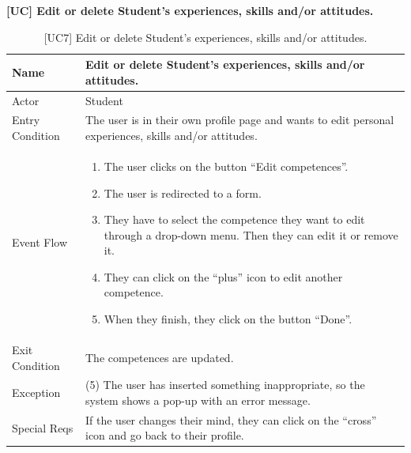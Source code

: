 \textbf{[UC\nextUseCases] Edit or delete Student’s experiences, skills and/or attitudes.}
\begin{table}[H] %
    \centering
    \begin{tabular}{|p{3cm}|p{10cm}|}
    \hline
    Name & Edit or delete Student’s experiences, skills and/or attitudes. \\ \hline
    Actor  & Student \\ \hline
    Entry Condition  & The user is in their own profile page and wants to edit personal experiences, skills and/or attitudes. \\ \hline
    Event Flow  & 
    \begin{enumerate}[noitemsep, topsep=0pt]
        \item The user clicks on the button “Edit competences”.
        \item The user is redirected to a form.
        \item They have to select the competence they want to edit through a drop-down menu. Then they can edit it or remove it.
        \item They can click on the “plus” icon to edit another competence.
        \item When they finish, they click on the button “Done”.
    \end{enumerate}
    \\ \hline
    Exit Condition  &  The competences are updated. \\ \hline
    Exception  & (5) The user has inserted something inappropriate, so the system shows a pop-up with an error message. \\ \hline
    Special Reqs  & If the user changes their mind, they can click on the “cross” icon and go back to their profile. \\ \hline
    \end{tabular}
    \caption{[UC7] Edit or delete Student’s experiences, skills and/or attitudes.}
\end{table}

